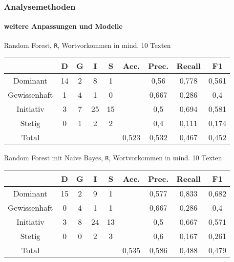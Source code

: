 \begin{frame}
 \frametitle{Analysemethoden}
 \framesubtitle{weitere Anpassungen und Modelle}
 
 Random Forest, \texttt{R}, Wortvorkommen in mind. 10 Texten
 \begin{center}
 \begin{tabular}{c|c|c|c|c|c|c|c|c|}
                & D     & G  & I    & S   & Acc.  & Prec. & Recall    & F1 \\
  \hline
  Dominant      & 14    & 2  & 8    & 1   &       & 0,56  & 0,778     & 0,561 \\
  Gewissenhaft  & 1     & 4  & 1    & 0   &       & 0,667 & 0,286     & 0,4 \\
  Initiativ     & 3     & 7  & 25   & 15  &       & 0,5   & 0,694     & 0,581\\
  Stetig        & 0     & 1  & 2    & 2   &       & 0,4   & 0,111     & 0,174\\
  \hline
  Total         &       &    &      &     & 0,523 & 0,532 & 0,467     & 0,452\\
  \hline
 \end{tabular}
 \end{center}
 
 \vspace{12pt}
 Random Forest mit Naive Bayes, \texttt{R}, Wortvorkommen in mind. 10 Texten
 \begin{center}
  \begin{tabular}{c|c|c|c|c|c|c|c|c|}
                & D     & G  & I    & S   & Acc.  & Prec. & Recall    & F1 \\
  \hline
  Dominant      & 15    & 2  & 9    & 1   &       & 0,577 & 0,833     & 0,682 \\
  Gewissenhaft  & 0     & 4  & 1    & 1   &       & 0,667 & 0,286     & 0,4 \\
  Initiativ     & 3     & 8  & 24   & 13  &       & 0,5   & 0,667     & 0,571\\
  Stetig        & 0     & 0  & 2    & 3   &       & 0,6   & 0,167     & 0,261\\
  \hline
  Total         &       &    &      &     & 0,535 & 0,586 & 0,488     & 0,479\\
  \hline
 \end{tabular}
 \end{center}
 
\end{frame}